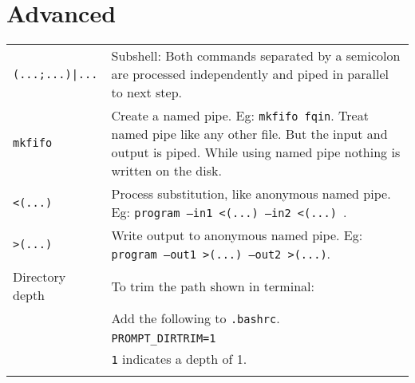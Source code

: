 \section{Advanced}

\begin{tabularx}{\linewidth}{lX}

\texttt{(...;...)|...} & Subshell: Both commands separated by a semicolon are processed independently and piped in parallel to next step. \\

\texttt{mkfifo} & Create a named pipe. Eg: \texttt{mkfifo fqin}. Treat named pipe like any other file. But the input and output is piped. While using named pipe nothing is written on the disk.\\

\texttt{<(...)} & Process substitution, like anonymous named pipe. Eg: \texttt{program --in1 <(...) --in2 <(...) }.\\

\texttt{>(...)} & Write output to anonymous named pipe. Eg: \texttt{program --out1 >(...) --out2 >(...)}.\\
Directory depth & To trim the path shown in terminal:\\
& Add the following to \texttt{.bashrc}.\\
& \texttt{PROMPT\_DIRTRIM=1}\\
& \texttt{1} indicates a depth of 1.\\
\hline\\

\end{tabularx}

